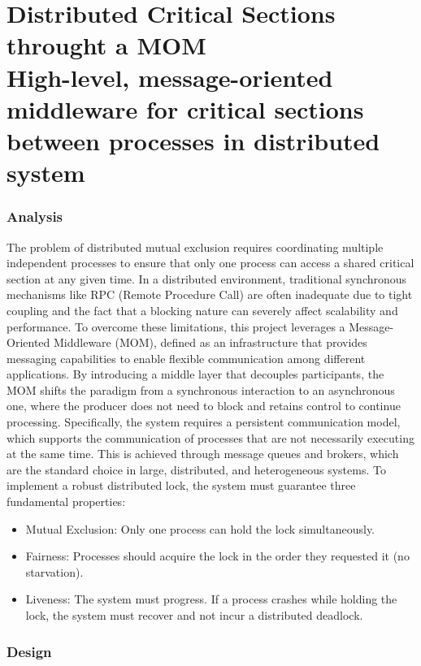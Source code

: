 \documentclass{scrartcl}
\begin{document}
    \clearpage
    \part[Distributed Critical Sections throught a MOM]{Distributed Critical Sections throught a MOM \\\LARGE{High-level, message-oriented middleware for critical sections between processes in distributed system}}

    \section{Analysis}
    The problem of distributed mutual exclusion requires coordinating multiple independent processes to ensure that only one process can access a shared critical section at any given time. In a distributed environment, traditional synchronous mechanisms like RPC (Remote Procedure Call) are often inadequate due to tight coupling and the fact that a blocking nature can severely affect scalability and performance.  To overcome these limitations, this project leverages a Message-Oriented Middleware (MOM), defined as an infrastructure that provides messaging capabilities to enable flexible communication among different applications. By introducing a middle layer that decouples participants, the MOM shifts the paradigm from a synchronous interaction to an asynchronous one, where the producer does not need to block and retains control to continue processing.  Specifically, the system requires a persistent communication model, which supports the communication of processes that are not necessarily executing at the same time. This is achieved through message queues and brokers, which are the standard choice in large, distributed, and heterogeneous systems.  To implement a robust distributed lock, the system must guarantee three fundamental properties:

    \begin{itemize}
        \item Mutual Exclusion: Only one process can hold the lock simultaneously.
        \item Fairness: Processes should acquire the lock in the order they requested it (no starvation).
        \item Liveness: The system must progress. If a process crashes while holding the lock, the system must recover and not incur a distributed deadlock.
    \end{itemize}

    \section{Design}
\end{document}
